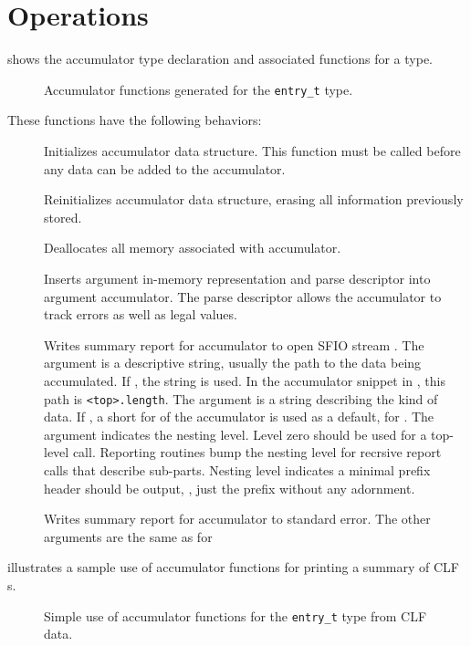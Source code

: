 \section{Operations}
 shows the accumulator type
declaration and associated functions for a \pads{} type.
\begin{figure}
\caption{Accumulator functions generated for the \texttt{entry\_t}  type.}
\label{figure:accumulators}
\end{figure}
%
These functions have the following behaviors:
\begin{description}
\item[] Initializes accumulator data
  structure. This function must be called before any data can be added
  to the accumulator.
\item[] Reinitializes accumulator data
  structure, erasing all information previously stored.
\item[] Deallocates all memory associated
  with accumulator.
\item[] Inserts argument in-memory
  representation and parse descriptor into argument
  accumulator.  The parse descriptor allows the accumulator to track
  errors as well as legal values.
\item[] Writes summary report for
  accumulator  to open
  SFIO stream .  The argument  is a descriptive
  string, usually the path to the data being accumulated. If
  , the string  is used. In
  the accumulator snippet in , this
  path is \texttt{<top>.length}.  The argument  is a string
  describing the kind of data.  If , a short for of the
  accumulator is used as a default, \eg{}  for
  . The argument  indicates the nesting
  level. Level zero should be used for a top-level call.  Reporting
  routines bump the nesting level for recrsive report calls that
  describe sub-parts.  Nesting level  indicates a
  minimal prefix header should be output, \ie{}, just the prefix
  without any adornment.
  
\item[] Writes summary report for
  accumulator  to standard error.  The other arguments are the
  same as for 
\end{description}
 illustrates a sample use of accumulator
functions for printing a summary of CLF s.  
\begin{figure}
\caption{Simple use of  accumulator functions for the
  \texttt{entry\_t} type from CLF data.}
\label{figure:wsl-accum-hand}
\end{figure}

